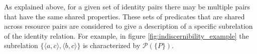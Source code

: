\documentclass[letterpaper]{article}
\begin{document}
As explained above, for a given set of identity pairs there may be
  multiple pairs that have the same shared properties.
These sets of predicates that are shared across resource pairs are considered to give a description of a specific subrelation of the identity relation. For example, in figure \ref{fig:indiscernibility_example} the subrelation $\{ \langle a, c \rangle, \langle b, c \rangle \}$ is characterized by $\mathcal{P}(\{ P \})$.

\end{document}
